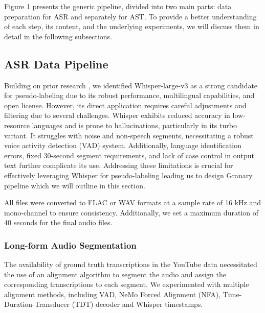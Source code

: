 Figure 1 presents the generic pipeline, divided into two main parts: data preparation for ASR and separately for AST. To provide a better understanding of each step, its content, and the underlying experiments, we will discuss them in detail in the following subsections.

\subsection{ASR Data Pipeline}

Building on prior research \cite{mosel}, we identified Whisper-large-v3 \cite{radford2023robust} as a strong candidate for pseudo-labeling due to its robust performance, multilingual capabilities, and open license. However, its direct application requires careful adjustments and filtering due to several challenges. Whisper exhibits reduced accuracy in low-resource languages and is prone to hallucinations, particularly in its turbo variant. It struggles with noise and non-speech segments, necessitating a robust voice activity detection (VAD) system. Additionally, language identification errors, fixed 30-second segment requirements, and lack of case control in output text further complicate its use. 
Addressing these limitations is crucial for effectively leveraging Whisper for pseudo-labeling leading us to design Granary pipeline which we will outline in this section.

All files were converted to FLAC or WAV formats at a sample rate of 16 kHz and mono-channel to ensure consistency. Additionally, we set a maximum duration of 40 seconds for the final audio files\cite{koluguri2024longer}. 





\subsubsection{Long-form Audio Segmentation}
\label{subsec:long-form-segmentation}

The availability of ground truth transcriptions in the YouTube data necessitated the use of an alignment algorithm to segment the audio and assign the corresponding transcriptions to each segment. We experimented with multiple alignment methods, including VAD, NeMo Forced Alignment (NFA)\cite{rastorgueva2023nemo}, Time-Duration-Transducer (TDT)\cite{koluguri2024longer} decoder and Whisper timestamps.

